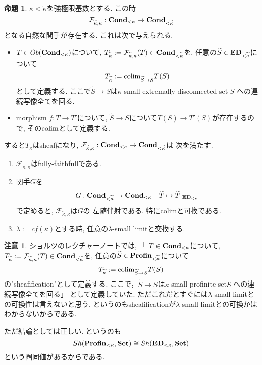 \documentclass[dvipdfmx,a4paper,11pt]{report}
\newcommand{\colim}{{\rm colim}}
\theoremstyle{definition}
\newtheorem{prop}[thm]{命題}
\newtheorem{rem}[thm]{注意}
\begin{document}
   \begin{tcolorbox}
 [colback = white, colframe = green!35!black, fonttitle = \bfseries,breakable = true]
\begin{prop}\cite[Proposition 2.9]{Sch19}
\label{prop-Sch19-2.9}
$\kappa < \widetilde{\kappa}$を強極限基数とする.
この時
$$
\mathcal{F}_{\widetilde{\kappa}, \kappa} : 
{\bf Cond_{<\kappa}} \to {\bf Cond_{<\widetilde{\kappa}}}
$$
となる自然な関手が存在する. 
これは次で与えられる. 
\begin{itemize}
\item $T \in Ob({\bf Cond_{<\kappa}})$について, $T_{\widetilde{\kappa}} :=\mathcal{F}_{\widetilde{\kappa}, \kappa}(T) \in {\bf Cond_{<\widetilde{\kappa}}}$を, 任意の$\widetilde{S} \in {\bf ED}_{< \widetilde{\kappa}}$について
$$
T_{\widetilde{\kappa}} := \colim_{\widetilde{S} \to S} T(S)
$$
として定義する. ここで$\widetilde{S} \to S$は$\kappa$-small extremally disconnected set $S$ への連続写像全てを回る.
\item morphism $f : T \to T'$について, $\widetilde{S} \to S$について$T(S) \to T'(S)$が存在するので, その$\colim$として定義する. 

\end{itemize}
すると$T_{\widetilde{\kappa}} $はsheafになり, $\mathcal{F}_{\widetilde{\kappa}, \kappa} : {\bf Cond_{<\kappa}} \to {\bf Cond_{<\widetilde{\kappa}}}$は
次を満たす.
\begin{enumerate}
\item $\mathcal{F}_{\widetilde{\kappa}, \kappa} $はfully-faithfullである. 
\item 関手$G$を
$$
G : {\bf Cond_{<\widetilde{\kappa}}} \to {\bf Cond_{<\kappa}} 
\quad \widetilde{T} \mapsto \widetilde{T}|_{{\bf ED}_{< \kappa}}
$$
で定めると, 
$\mathcal{F}_{\widetilde{\kappa}, \kappa}$は$G$の
左随伴射である. 特にcolimと可換である.
\item $\lambda := cf(\kappa)$とする時, 任意の$\lambda$-small limitと交換する. 
\end{enumerate}
 \end{prop}
 \end{tcolorbox}
 \begin{rem}
 ショルツのレクチャーノートでは, 
「 $T \in {\bf Cond_{<\kappa}} $について, $T_{\widetilde{\kappa}} :=\mathcal{F}_{\widetilde{\kappa}, \kappa}(T) \in {\bf Cond_{<\widetilde{\kappa}}}$を, 任意の$\widetilde{S} \in {\bf Profin}_{< \widetilde{\kappa}}$について
$$
T_{\widetilde{\kappa}} := \colim_{\widetilde{S} \to S} T(S)
$$
の"sheafification"として定義する. ここで，$\widetilde{S} \to S$は$\kappa$-small profinite set$S$ への連続写像全てを回る」
として定義していた.
ただこれだとすぐには$\lambda$-small limitとの可換性は言えないと思う. というのもsheafificationが$\lambda$-small limitとの可換かはわからないからである. 

ただ結論としては正しい. というのも
$$
Sh({\bf Profin}_{<\kappa}, {\bf Set}) \cong Sh({\bf ED}_{<\kappa}, {\bf Set}) 
$$
という圏同値があるからである. 

 \end{rem}
\end{document}
